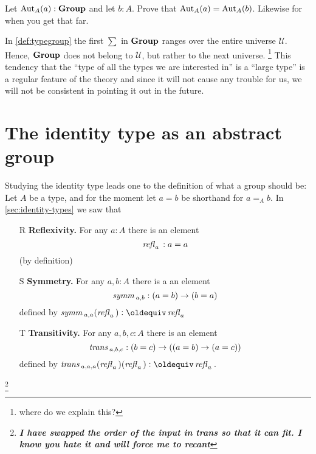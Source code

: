 \begin{xca}
   Let $\mathrm{Aut}_A(a):\mathbf{Group}$ and let $b:A$.  Prove that $\mathrm{Aut}_A(a)=\mathrm{Aut}_A(b)$.  Likewise for \inftygps when you get that far.
\end{xca}
\begin{remark}\label{rem:monoidandabsgplarge}
 In \cref{def:typegroup} the first $\sum$ in $\mathbf{Group}$ ranges over the entire universe $\mathcal U$.  Hence, $\mathbf{Group}$ does not belong to $\mathcal U$, but rather to the next universe. \footnote{where do we explain this?}  This tendency that the ``type of all the types we are interested in'' is a ``large type'' is a regular feature of the theory and since it will not cause any trouble for us, we will not be consistent in pointing it out in the future.
  \end{remark}

\section{The identity type as an abstract group }
\label{sec:identity-type-as-abstract}

Studying the identity type leads one to the definition of what a group should be:
Let $A$ be a type, and for the moment let $a=b$ be shorthand for $a=_Ab$.  In \cref{sec:identity-types} we saw that
\begin{enumerate}
\item[R] {\bf Reflexivity.} For any $a:A$ there is an element
$$\mathop{{\it refl}_{a}}{}:a=a$$ (by definition)
\item[S] {\bf Symmetry.} For any $a,b:A$ there is a an element $$\mathop{\mathit{symm}}{}_{a,b}:(a=b)\to (b=a)$$ defined by $\symm{}_{a,a}(\refl a{})\defequi\refl a{}$
\item[T] {\bf Transitivity.} For any $a,b,c:A$ there is an element $$\mathop{\mathit{trans}}{}_{a,b,c}:(b=c)\to((a=b)\to(a=c))$$ defined by $\trans{}_{a,a,a}(\refl a{})(\refl a{})\defequi \refl a{}$.
\end{enumerate}
\footnote{\em\bf I have swapped the order of the input in trans so that it can fit.  I know you hate it and will force me to recant}

